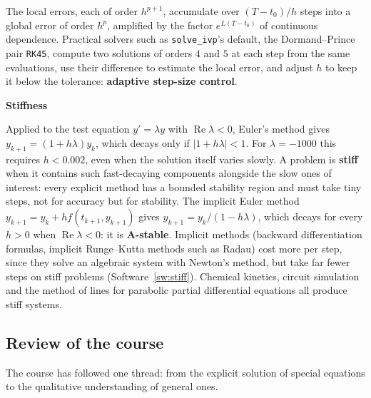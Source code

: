 \documentclass[11pt,a4paper]{article}
\numberwithin{equation}{section}
\DeclareMathOperator{\Real}{Re}
\theoremstyle{definition}
\newcommand{\subhead}[1]{%
  \par\medskip\noindent\textbf{#1}\par\nobreak\smallskip}
\begin{document}
The local errors, each of order $h^{p+1}$, accumulate over $(T - t_0)/h$ steps into a global error of order $h^p$, amplified by the factor $e^{L(T - t_0)}$ of continuous dependence. Practical solvers such as
\texttt{solve\_ivp}'s default, the Dormand--Prince pair \texttt{RK45}, compute two solutions of orders $4$ and $5$ at each step from the same evaluations, use their difference to estimate the local error, and
adjust $h$ to keep it below the tolerance: \textbf{adaptive step-size control}.

\subhead{Stiffness}
Applied to the test equation $y' = \lambda y$ with $\Real\lambda < 0$, Euler's method gives $y_{k+1} = (1 + h\lambda)y_k$, which decays only if $|1 + h\lambda| < 1$. For $\lambda = -1000$ this requires $h < 0.002$, even when the solution itself
varies slowly. A problem is \textbf{stiff} when it contains such fast-decaying components alongside the slow ones of interest: every explicit method has a bounded stability region and must take tiny
steps, not for accuracy but for stability. The implicit Euler method $y_{k+1} = y_k + hf(t_{k+1}, y_{k+1})$ gives $y_{k+1} = y_k/(1 - h\lambda)$, which decays for every $h > 0$ when $\Real\lambda < 0$: it is \textbf{A-stable}. Implicit methods
(backward differentiation formulas, implicit Runge--Kutta methods such as Radau) cost more per step, since they solve an algebraic system with Newton's method, but take far fewer steps on
stiff problems (Software~\ref{sw:stiff}). Chemical kinetics, circuit simulation and the method of lines for parabolic partial differential equations all produce stiff systems.

\subsection{Review of the course}
\label{ssec:review}

The course has followed one thread: from the explicit solution of special equations to the qualitative understanding of general ones.
\end{document}
